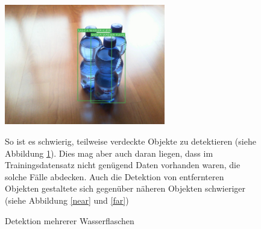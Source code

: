 \begin{figure}[htbp]
	\begin{minipage}[t]{8cm}
		\vspace{0pt}
		\includegraphics[width=7cm]{Bilder/double.jpeg}
		\caption[Detektion mehrerer Wasserflaschen]{Detektion mehrerer Wasserflaschen}
		\label{double}
	\end{minipage}
	\hfill
	\begin{minipage}[t]{8cm}
		\vspace{0pt}
		\begin{onehalfspace}
			So ist es schwierig, teilweise verdeckte Objekte zu detektieren (siehe Abbildung \ref{double}). Dies mag aber auch daran liegen, dass im Trainingsdatensatz nicht genügend Daten vorhanden waren, die solche Fälle abdecken. Auch die Detektion von entfernteren Objekten gestaltete sich gegenüber näheren Objekten schwieriger (siehe Abbildung \ref{near} und \ref{far})
		\end{onehalfspace}
	\end{minipage}
\end{figure}

